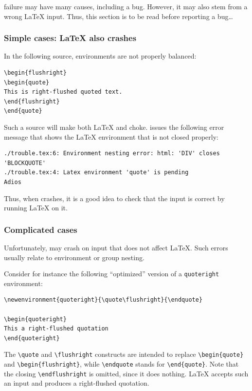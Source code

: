 \hevea{} failure may have many causes, including a bug.
However, it may also stem from a wrong \LaTeX{} input.
Thus, this section is to be read before reporting a bug\ldots

\subsubsection{Simple cases: \LaTeX{} also crashes}
In  the following source, environments are not properly balanced:
\begin{verbatim}
\begin{flushright}
\begin{quote}
This is right-flushed quoted text.
\end{flushright}
\end{quote}
\end{verbatim}
Such a source will make both \LaTeX{} and \hevea{} choke.
\hevea{} issues the following error message that shows the \LaTeX{}
environment that is not closed properly:
\begin{verbatim}
./trouble.tex:6: Environment nesting error: html: 'DIV' closes 'BLOCKQUOTE'
./trouble.tex:4: Latex environment 'quote' is pending
Adios
\end{verbatim}
Thus, when \hevea{} crashes, it is a good idea to check that the
input is correct by running \LaTeX{} on it.

\subsubsection{Complicated cases}

Unfortunately, \hevea{} may crash on input that does not affect
\LaTeX.
Such errors usually relate to environment or group nesting.

Consider for instance the following ``optimized'' version of a
\verb+quoteright+  environment:
\begin{verbatim}
\newenvironment{quoteright}{\quote\flushright}{\endquote}

\begin{quoteright}
This a right-flushed quotation
\end{quoteright}
\end{verbatim}

The \verb+\quote+ and \verb+\flushright+ constructs
are intended to replace
\verb+\begin{quote}+ and \verb+\begin{flushright}+,
while \verb+\endquote+ stands for \verb+\end{quote}+.
Note that the closing \verb+\endflushright+
is omitted, since it does nothing.
\LaTeX{} accepts such an input and produces a  right-flushed quotation.

